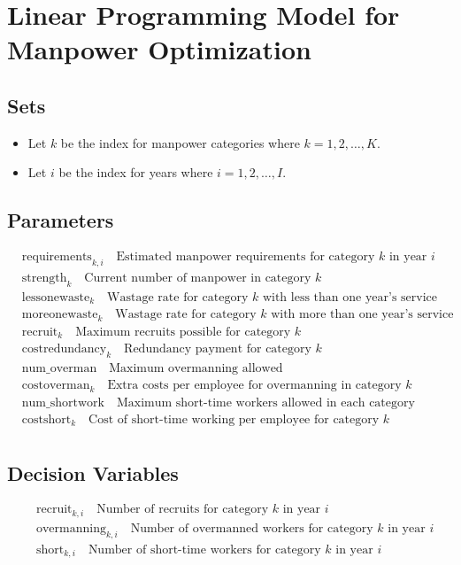 \documentclass{article}
\begin{document}
\section*{Linear Programming Model for Manpower Optimization}

\subsection*{Sets}
\begin{itemize}
    \item Let \( k \) be the index for manpower categories where \( k = 1, 2, \ldots, K \).
    \item Let \( i \) be the index for years where \( i = 1, 2, \ldots, I \).
\end{itemize}

\subsection*{Parameters}
\begin{align*}
    & \text{requirements}_{k,i} \quad \text{Estimated manpower requirements for category } k \text{ in year } i \\
    & \text{strength}_{k} \quad \text{Current number of manpower in category } k \\
    & \text{lessonewaste}_{k} \quad \text{Wastage rate for category } k \text{ with less than one year's service} \\
    & \text{moreonewaste}_{k} \quad \text{Wastage rate for category } k \text{ with more than one year's service} \\
    & \text{recruit}_{k} \quad \text{Maximum recruits possible for category } k \\
    & \text{costredundancy}_{k} \quad \text{Redundancy payment for category } k \\
    & \text{num\_overman} \quad \text{Maximum overmanning allowed} \\
    & \text{costoverman}_{k} \quad \text{Extra costs per employee for overmanning in category } k \\
    & \text{num\_shortwork} \quad \text{Maximum short-time workers allowed in each category} \\
    & \text{costshort}_{k} \quad \text{Cost of short-time working per employee for category } k \\
\end{align*}

\subsection*{Decision Variables}
\begin{align*}
    & \text{recruit}_{k,i} \quad \text{Number of recruits for category } k \text{ in year } i \\
    & \text{overmanning}_{k,i} \quad \text{Number of overmanned workers for category } k \text{ in year } i \\
    & \text{short}_{k,i} \quad \text{Number of short-time workers for category } k \text{ in year } i \\
\end{align*}
\end{document}
